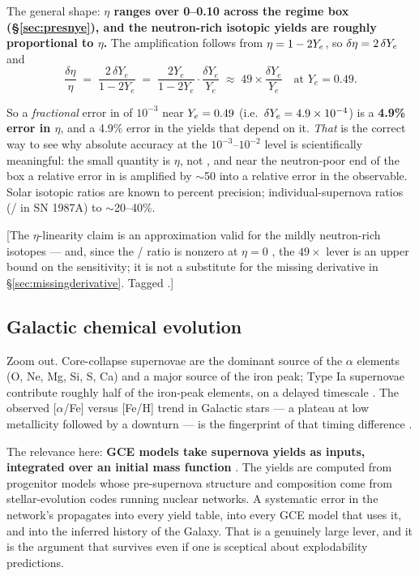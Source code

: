 The general shape: \textbf{$\eta$ ranges over 0--0.10 across the regime box
(\S\ref{sec:presnye}), and the neutron-rich isotopic yields are roughly
proportional to $\eta$.} The amplification follows from $\eta = 1 - 2Y_{e}$, so
$\delta\eta = 2\,\delta Y_{e}$ and
%
\begin{equation}\label{eq:etalever}
\frac{\delta\eta}{\eta} \;=\; \frac{2\,\delta Y_e}{1-2Y_e}
\;=\; \frac{2Y_e}{1-2Y_e}\cdot\frac{\delta Y_e}{Y_e}
\;\approx\; 49\times\frac{\delta Y_e}{Y_e}
\quad\text{at } Y_e = 0.49 .
\end{equation}

So a \emph{fractional} error in \Ye{} of $10^{-3}$ near $Y_{e} = 0.49$ (i.e.\
$\delta Y_{e} = 4.9 \times 10^{-4}$) is a \textbf{4.9\% error in $\eta$}, and a
4.9\% error in the yields that depend on it. \emph{That} is the correct way to
see why absolute \Ye{} accuracy at the $10^{-3}$--$10^{-2}$ level is
scientifically meaningful: the small quantity is $\eta$, not \Ye, and near the
neutron-poor end of the box a relative error in \Ye{} is amplified by $\sim$50
into a relative error in the observable. Solar isotopic ratios are known to
percent precision; individual-supernova ratios (\nuc{Ni}{57}/\nuc{Ni}{56} in SN
1987A) to $\sim$20--40\%.

[The $\eta$-linearity claim is an approximation valid for the mildly
neutron-rich isotopes --- and, since the \nuc{Ni}{57}/\nuc{Ni}{56} ratio is
nonzero at $\eta = 0$ \citep{seitenzahl2014}, the $49\times$ lever is an upper
bound on the sensitivity; it is not a substitute for the missing derivative in
\S\ref{sec:missingderivative}. Tagged \textbf{\derivedhere[approximate]}.]

\subsection{Galactic chemical evolution}
\label{sec:gce}

Zoom out. Core-collapse supernovae are the dominant source of the $\alpha$
elements (O, Ne, Mg, Si, S, Ca) and a major source of the iron peak; Type Ia
supernovae contribute roughly half of the iron-peak elements, on a delayed
timescale \citep{kobayashi2020}. The observed [$\alpha$/Fe] versus [Fe/H] trend
in Galactic stars --- a plateau at low metallicity followed by a downturn --- is
the fingerprint of that timing difference \citep{tinsley1979, kobayashi2020}.

The relevance here: \textbf{GCE models take supernova yields as inputs,
integrated over an initial mass function} \citep{kobayashi2020}. The yields are
computed from progenitor models whose pre-supernova structure and composition
come from stellar-evolution codes running nuclear networks. A systematic error
in the network's \Ye{} propagates into every yield table, into every GCE model
that uses it, and into the inferred history of the Galaxy. That is a genuinely
large lever, and it is the argument that survives even if one is sceptical
about explodability predictions.

